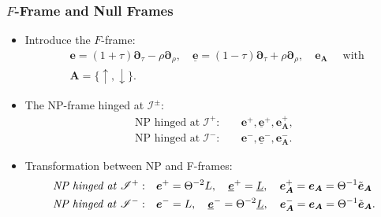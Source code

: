 \documentclass{beamer}
\theoremstyle{remark}
\theoremstyle{plain}
\theoremstyle{plain}
\begin{document}
\begin{frame}
  \frametitle{$F$-Frame and Null Frames}
  \begin{itemize}
    \item Introduce the $F$-frame:
    \begin{align}
      & \boldsymbol{e}=(1+\tau) \boldsymbol{\partial}_\tau-\rho \boldsymbol{\partial}_\rho, \quad \underline{\boldsymbol{e}}=(1-\tau) \boldsymbol{\partial}_\tau+\rho \boldsymbol{\partial}_\rho, \quad \boldsymbol{e}_{\boldsymbol{A}} \quad \text { with } \nonumber \\ 
      & \boldsymbol{A}=\{\uparrow, \downarrow\}.
    \end{align}
    \item The NP-frame hinged at $\mathscr{I}^{\pm}$:
    \begin{align*}
      \text{NP hinged at} \; \mathscr{I}^{+}: & \quad \boldsymbol{e}^{+}, \underline{\boldsymbol{e}}^{+}, \boldsymbol{e}_{\boldsymbol{A}}^{+}, \\
      \text{NP hinged at} \; \mathscr{I}^{-}: & \quad \boldsymbol{e}^{-}, \underline{\boldsymbol{e}}^{-}, \boldsymbol{e}_{\boldsymbol{A}}^{-}.
    \end{align*}
    \item Transformation between NP and F-frames:
    \begin{align*}
      \text{\emph{NP hinged at} $\mathscr{I}^{+}$}:& \quad\boldsymbol{e}^{+} = \Theta^{-2} L, \quad \underline{\boldsymbol{e}}^{+}= \underline{L},\quad \boldsymbol{e}_{\boldsymbol{A}}^{+}= \boldsymbol{e}_{\boldsymbol{A}}= \Theta^{-1}\tilde{\boldsymbol{e}}_{\boldsymbol{A}}\\ \text{\emph{NP hinged at} $\mathscr{I}^{-}$}:& \quad\boldsymbol{e}^{-} =
       L,\quad \underline{\boldsymbol{e}}^{-}=  \Theta^{-2} \underline{L},\quad \boldsymbol{e}_{\boldsymbol{A}}^{-}= \boldsymbol{e}_{\boldsymbol{A}} = \Theta^{-1}\tilde{\boldsymbol{e}}_{\boldsymbol{A}}.
    \end{align*}
  \end{itemize}
\end{frame}

\end{document}
